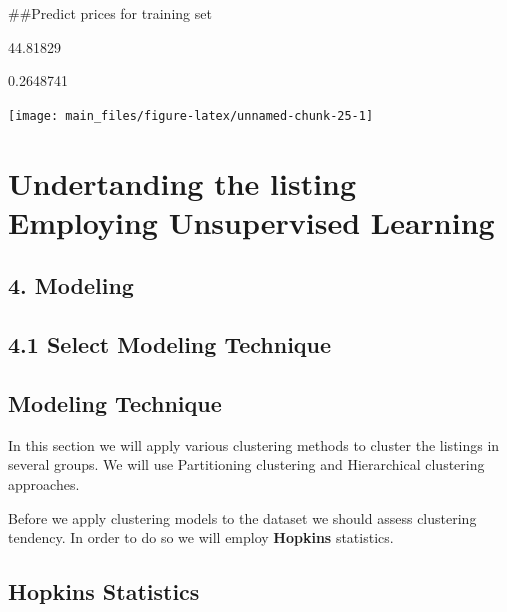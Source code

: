 \#\#Predict prices for training set

\begin{Schunk}
\begin{Soutput}
[1] 44.81829
\end{Soutput}
\begin{Soutput}
[1] 0.2648741
\end{Soutput}
\end{Schunk}

\begin{Schunk}


\begin{center}\texttt{[image: main\_files/figure-latex/unnamed-chunk-25-1]} \end{center}

\end{Schunk}

\hypertarget{undertanding-the-listing-employing-unsupervised-learning}{%
\section{Undertanding the listing Employing Unsupervised
Learning}\label{undertanding-the-listing-employing-unsupervised-learning}}

\hypertarget{modeling-1}{%
\subsection{4. Modeling}\label{modeling-1}}

\hypertarget{select-modeling-technique-1}{%
\subsection{4.1 Select Modeling
Technique}\label{select-modeling-technique-1}}

\hypertarget{modeling-technique-1}{%
\subsection{Modeling Technique}\label{modeling-technique-1}}

In this section we will apply various clustering methods to cluster the
listings in several groups. We will use Partitioning clustering and
Hierarchical clustering approaches.

Before we apply clustering models to the dataset we should assess
clustering tendency. In order to do so we will employ \textbf{Hopkins}
statistics.

\hypertarget{hopkins-statistics}{%
\subsection{Hopkins Statistics}\label{hopkins-statistics}}

